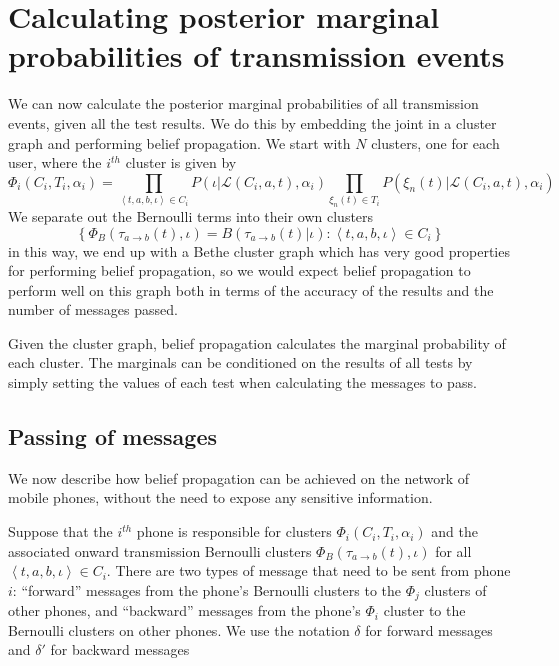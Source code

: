 \documentclass{article}
\begin{document}
\section{Calculating posterior marginal probabilities of transmission events}

We can now calculate the posterior marginal probabilities of all transmission events, given all the test results. We do this by embedding the joint in a cluster graph and performing belief propagation. We start with $N$ clusters, one for each user, where the $i^{th}$ cluster is given by
\begin{equation}
\Phi_i(C_i, T_i,\alpha_i) =
\prod_{\left< t,a,b, \iota \right> \in C_i}
P\left(\iota|\mathcal{L}(C_i,a,t),\alpha_i \right)
\prod_{\xi_{n}(t) \in T_i}
P(\xi_{n}(t)|\mathcal{L}(C_i,a,t),\alpha_i)
\label{ijoint}
\end{equation}
We separate out the Bernoulli terms into their own clusters
\begin{equation}
\left\{ \Phi_{B}(\tau_{a\rightarrow b}(t),\iota) = B(\tau_{a\rightarrow b}(t)|\iota) : \left<t,a,b,\iota\right> \in C_i \right\}
\end{equation}
in this way, we end up with a Bethe cluster graph which has very good properties for performing belief propagation, so we would expect belief propagation to perform well on this graph both in terms of the accuracy of the results and the number of messages passed.

Given the cluster graph, belief propagation calculates the marginal probability of each cluster. The marginals can be conditioned on the results of all tests by simply setting the values of each test when calculating the messages to pass.

\subsection{Passing of messages}

We now describe how belief propagation can be achieved on the network of mobile phones, without the need to expose any sensitive information.

Suppose that the $i^{th}$ phone is responsible for clusters $\Phi_i(C_i,T_i,\alpha_i)$ and the associated onward transmission Bernoulli clusters $\Phi_{B}(\tau_{a\rightarrow b}(t),\iota)$ for all $\left<t,a,b,\iota\right>\in C_i$. There are two types of message that need to be sent from phone $i$: ``forward'' messages from the phone's Bernoulli clusters to the $\Phi_j$ clusters of other phones, and ``backward'' messages from the phone's $\Phi_i$ cluster to the Bernoulli clusters on other phones. We use the notation $\delta$ for forward messages and $\delta'$ for backward messages
\end{document}
